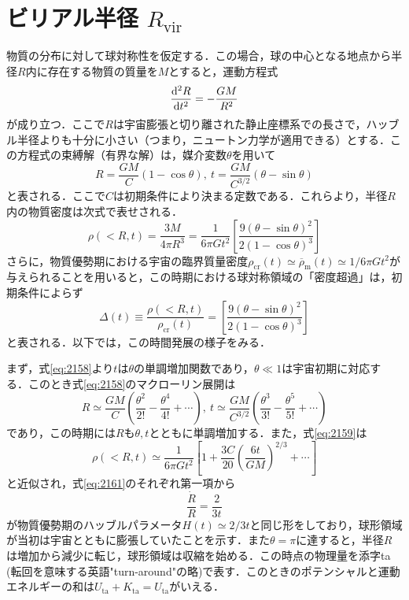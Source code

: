 \section{ビリアル半径 $R_\text{vir}$}

物質の分布に対して球対称性を仮定する．この場合，球の中心となる地点から半径$R$内に存在する物質の質量を$M$とすると，運動方程式
\begin{equation}
	\dv[2]{R}{t} = - \frac{GM}{R^2}
\end{equation}
が成り立つ．ここで$R$は宇宙膨張と切り離された静止座標系での長さで，ハッブル半径よりも十分に小さい（つまり，ニュートン力学が適用できる）とする．この方程式の束縛解（有界な解）は，媒介変数$\theta$を用いて
\begin{equation}
	R=\frac{GM}{C}(1-\cos\theta),\ t = \frac{GM}{C^{3/2}}(\theta - \sin\theta) \label{eq:2158}
\end{equation}
と表される．ここで$C$は初期条件により決まる定数である．これらより，半径$R$内の物質密度は次式で表せされる．
\begin{equation}
	\rho(<R,t) = \frac{3M}{4\pi R^3} = \frac{1}{6\pi Gt^2} \left[ \frac{9(\theta - \sin\theta)^2}{2(1-\cos\theta)^3} \right] \label{eq:2159}
\end{equation}
さらに，物質優勢期における宇宙の臨界質量密度$ \rho_\text{cr}(t) \simeq \overline{\rho}_\text{m}(t) \simeq 1/{6\pi Gt^2}$が与えられることを用いると，この時期における球対称領域の「密度超過」は，初期条件によらず
\begin{equation}
	\Delta(t) \equiv \frac{\rho(<R,t)}{\rho_\text{cr}(t)} = \left[\frac{9(\theta - \sin\theta)^2}{2(1-\cos\theta)^3}\right]
\end{equation}
と表される．以下では，この時間発展の様子をみる．

まず，式\eqref{eq:2158}より$t$は$\theta$の単調増加関数であり，$\theta \ll 1$は宇宙初期に対応する．このとき式\eqref{eq:2158}のマクローリン展開は
\begin{equation}
	R \simeq \frac{GM}{C} \left( \frac{\theta^2}{2!} - \frac{\theta^4}{4!} + \cdots \right), \ t \simeq \frac{GM}{C^{3/2}} \left( \frac{\theta^3}{3!} - \frac{\theta^5}{5!} + \cdots \right)
\end{equation}
であり，この時期には$R$も$\theta,t$とともに単調増加する．また，式\eqref{eq:2159}は
\begin{equation}
	\rho(<R, t) \simeq \frac{1}{6 \pi G t^2} \left[ 1 + \frac{3C}{20}\left( \frac{6t}{GM} \right)^{2/3} + \cdots \right] \label{eq:2161}
\end{equation}
と近似され，式\eqref{eq:2161}のそれぞれ第一項から
\begin{equation}
	\frac{\dot{R}}{R} = \frac{2}{3t}
\end{equation}
が物質優勢期のハッブルパラメータ$H(t) \simeq 2/3t$と同じ形をしており，球形領域が当初は宇宙とともに膨張していたことを示す．また$\theta = \pi$に達すると，半径$R$は増加から減少に転じ，球形領域は収縮を始める．この時点の物理量を添字ta (転回を意味する英語"turn-around"の略)で表す．このときのポテンシャルと運動エネルギーの和は$U_\text{ta}+K_\text{ta} = U_\text{ta}$がいえる．

